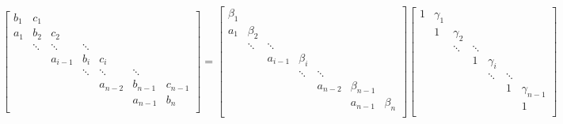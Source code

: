 \documentclass[landscape]{article}
\begin{document}
\[
\left[\begin{array}{ccccccccc}
b_{1} & c_{1}    &           &           &           &           &         \\
a_{1} & b_{2}    & c_{2}     &           &           &           &         \\
      & \ddots   & \ddots    & \ddots    &           &           &         \\
      &          & a_{i-1}   & b_{i}     & c_{i}     &           &         \\
      &          &           & \ddots    & \ddots    & \ddots    &         \\
      &          &           &           & a_{n-2}   & b_{n-1}   & c_{n-1} \\
      &          &           &           &           & a_{n-1}   & b_{n}   \\
\end{array} \right] 
=
\left[\begin{array}{ccccccccc}
\beta_{1}  &               &              &              &              &             &           \\
a_{1} &      \beta_{2}     &              &              &              &             &           \\
           & \ddots        & \ddots       &              &              &             &           \\
           &               & a_{i-1}      & \beta_{i}    &              &             &           \\
           &               &              & \ddots       & \ddots       &             &           \\
           &               &              &              & a_{n-2}      & \beta_{n-1} &           \\
           &               &              &              &              & a_{n-1}     & \beta_{n} \\
\end{array} \right] 
\left[\begin{array}{ccccccccc}
1     & \gamma_{1}  &           &           &              &           &             \\
      & 1           & \gamma_{2}            &              &           &             \\
      &             & \ddots    & \ddots    &              &           &             \\
      &             &           & 1         & \gamma_{i}   &           &             \\
      &             &           &           & \ddots       & \ddots    &             \\
      &             &           &           &              & 1         & \gamma_{n-1}\\
      &             &           &           &              &           & 1           \\
\end{array} \right] 
\]
\end{document}
